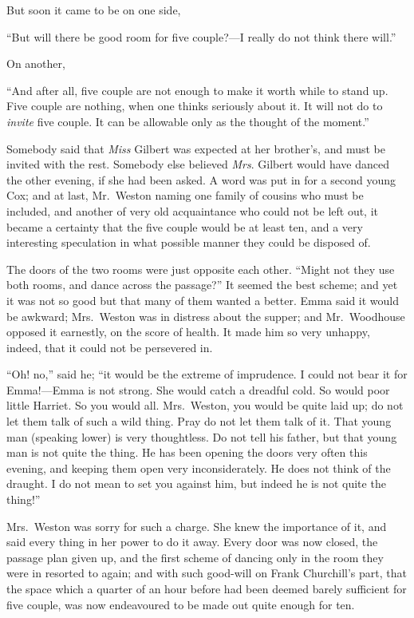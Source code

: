 But soon it came to be on one side,

``But will there be good room for five couple?---I really do not think
there will.''

On another,

``And after all, five couple are not enough to make it worth
while to stand up.  Five couple are nothing, when one thinks
seriously about it.  It will not do to \emph{invite} five couple.
It can be allowable only as the thought of the moment.''

Somebody said that \emph{Miss} Gilbert was expected at her brother's,
and must be invited with the rest.  Somebody else believed
\emph{Mrs}. Gilbert would have danced the other evening, if she had
been asked.  A word was put in for a second young Cox; and at last,
Mr.\ Weston naming one family of cousins who must be included,
and another of very old acquaintance who could not be left out,
it became a certainty that the five couple would be at least ten,
and a very interesting speculation in what possible manner they
could be disposed of.

The doors of the two rooms were just opposite each other.
``Might not they use both rooms, and dance across the passage?''
It seemed the best scheme; and yet it was not so good but that
many of them wanted a better.  Emma said it would be awkward;
Mrs.\ Weston was in distress about the supper; and Mr.\ Woodhouse
opposed it earnestly, on the score of health.  It made him so
very unhappy, indeed, that it could not be persevered in.

``Oh! no,'' said he; ``it would be the extreme of imprudence.
I could not bear it for Emma!---Emma is not strong.  She would
catch a dreadful cold.  So would poor little Harriet.
So you would all.  Mrs.\ Weston, you would be quite laid up;
do not let them talk of such a wild thing.  Pray do not let them
talk of it.  That young man (speaking lower) is very thoughtless.
Do not tell his father, but that young man is not quite the thing.
He has been opening the doors very often this evening, and keeping
them open very inconsiderately.  He does not think of the draught.
I do not mean to set you against him, but indeed he is not quite
the thing!''

Mrs.\ Weston was sorry for such a charge.  She knew the importance
of it, and said every thing in her power to do it away.  Every door
was now closed, the passage plan given up, and the first scheme
of dancing only in the room they were in resorted to again;
and with such good-will on Frank Churchill's part, that the space
which a quarter of an hour before had been deemed barely sufficient
for five couple, was now endeavoured to be made out quite enough
for ten.

